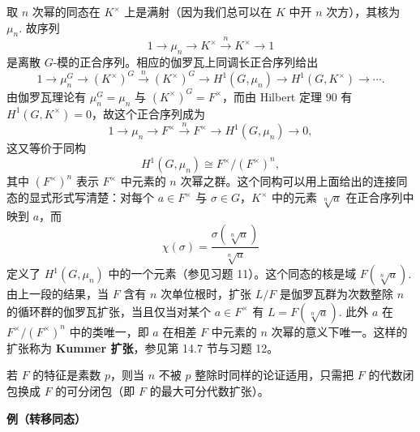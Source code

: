 取 \(n\) 次幂的同态在 \(K^\times\) 上是满射（因为我们总可以在 \(K\) 中开 \(n\) 次方），其核为 \(\mu_n\). 故序列
\[
1 \to \mu_n \to K^\times \xrightarrow{n} K^\times \to 1
\]
是离散 \(G\)-模的正合序列。相应的伽罗瓦上同调长正合序列给出
\[
1 \to \mu_n^G \to (K^\times)^G \xrightarrow{n} (K^\times)^G \to H^1(G, \mu_n) \to H^1(G, K^\times) \to \cdots.
\]
由伽罗瓦理论有 \(\mu_n^G = \mu_n\) 与 \((K^\times)^G = F^\times\)，而由 Hilbert 定理 90 有 \(H^1(G, K^\times) = 0\)，故这个正合序列成为
\[
1 \to \mu_n \to F^\times \xrightarrow{n} F^\times \to H^1(G, \mu_n) \to 0,
\]
这又等价于同构
\[
H^1(G, \mu_n) \cong F^\times/(F^\times)^n,
\]
其中 \((F^\times)^n\) 表示 \(F^\times\) 中元素的 \(n\) 次幂之群。这个同构可以用上面给出的连接同态的显式形式写清楚：对每个 \(a \in F^\times\) 与 \(\sigma \in G\)，\(K^\times\) 中的元素 \(\sqrt[n]{a}\) 在正合序列中映到 \(a\)，而
\[
\chi(\sigma) = \frac{\sigma(\sqrt[n]{a})}{\sqrt[n]{a}}
\]
定义了 \(H^1(G, \mu_n)\) 中的一个元素（参见习题 11）。这个同态的核是域 \(F(\sqrt[n]{a})\). 由上一段的结果，当 \(F\) 含有 \(n\) 次单位根时，扩张 \(L/F\) 是伽罗瓦群为次数整除 \(n\) 的循环群的伽罗瓦扩张，当且仅当对某个 \(a \in F^\times\) 有 \(L = F(\sqrt[n]{a})\). 此外 \(a\) 在 \(F^\times/(F^\times)^n\) 中的类唯一，即 \(a\) 在相差 \(F\) 中元素的 \(n\) 次幂的意义下唯一。这样的扩张称为 \textbf{Kummer 扩张}，参见第 14.7 节与习题 12。

若 \(F\) 的特征是素数 \(p\)，则当 \(n\) 不被 \(p\) 整除时同样的论证适用，只需把 \(F\) 的代数闭包换成 \(F\) 的可分闭包（即 \(F\) 的最大可分代数扩张）。

\noindent\textbf{例（转移同态）}

